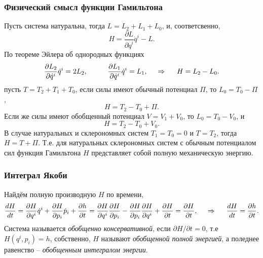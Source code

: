 \subsubsection*{Физический смысл функции Гамильтона}

Пусть система натуральна, тогда $L = L_2 + L_1 + L_0$, и, соответсвенно,
\begin{equation*}
    H = \frac{\partial L}{\partial \dot{q}^i} \dot{q}^i - L.
\end{equation*}
По теореме Эйлера об однородных функциях
\begin{equation*}
    \frac{\partial L_2}{\partial \dot{q}^i} \dot{q}^i = 2 L_2,
    \hspace{1cm} 
    \frac{\partial L_1}{\partial \dot{q}^i} \dot{q}^i = L_1,
    \hspace{0.5cm} \Rightarrow \hspace{0.5cm} 
    H = L_2 - L_0.
\end{equation*}
пусть $T = T_2 + T_1 + T_0$, если силы имеют обычный потенциал $\Pi$, то $L_0 = T_0 - \Pi$, 
\begin{equation*}
    H = T_2 - T_0 + \Pi.
\end{equation*}
Если же силы имеют обобщенный потенциал $V = V_1 + V_0$, то $L_0 = T_0 - V_0$, и
\begin{equation*}
    H = T_2 - T_0 + V_0.
\end{equation*}
В случае натуральных и склерономных систем $T_1 = T_0 = 0$ и $T = T_2$, тогда $H = T + \Pi$. Т.е. для натуральных склерономных систем с обычным потенциалом сил функция Гамильтона $H$ представляет собой полную механическую энергию.

\subsubsection*{Интеграл Якоби}

Найдём полную производную $H$ по времени,
\begin{equation*}
    \frac{d H}{d t} = \frac{\partial H}{\partial q^i} \dot{q}^i + \frac{\partial H}{\partial p_i} \dot{p}_i + \frac{\partial h}{\partial t} = 
    \frac{\partial H}{\partial q^i} \frac{\partial H}{\partial p_i} - \frac{\partial H}{\partial p_i} \frac{\partial H}{\partial q^i} + \frac{\partial H}{\partial t} = \frac{\partial H}{\partial t},
    \hspace{0.5cm} \Rightarrow \hspace{0.5cm} 
    \frac{d H}{d t} = \frac{\partial h}{\partial t}.
\end{equation*}
Система называется \textit{обобщенно консервативной}, если $\partial H / \partial t = 0$, т.е $H(q^i, p_i) = h$, собственно, $H$ называют \textit{обобщенной полной энергией}, а поледнее равенство -- \textit{обобщенным интегралом энергии}.



